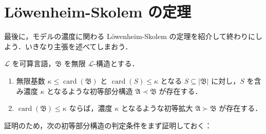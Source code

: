 \documentclass[a4j,xelatex,ja=standard]{ltjsarticle}
\begin{document}
\section{L\"{o}wenheim-Skolem の定理}
最後に，モデルの濃度に関わる L\"{o}wenheim-Skolem の定理を紹介して終わりにしよう．いきなり主張を述べてしまおう．

\begin{theorem}
 $\mathcal{L}$ を可算言語，$\mathfrak{B}$ を無限 $\mathcal{L}$-構造とする．
 \begin{enumerate}[label=(\alph{*})]
  \item 無限基数 $\kappa \leq \mathop{\mathrm{card}}(\mathfrak{B})$ と $\mathop{\mathrm{card}}(S) \leq \kappa$ となる $S \subseteq |\mathfrak{B}|$ に対し，$S$ を含み濃度 $\kappa$ となるような初等部分構造 $\mathfrak{A} \prec \mathfrak{B}$ が存在する．
  \item $\mathop{\mathrm{card}}(\mathfrak{B}) \leq \kappa$ ならば，濃度 $\kappa$ となるような初等拡大 $\mathfrak{A} \succ \mathfrak{B}$ が存在する．
 \end{enumerate}
\end{theorem}

証明のため，次の初等部分構造の判定条件をまず証明しておく：
\end{document}
